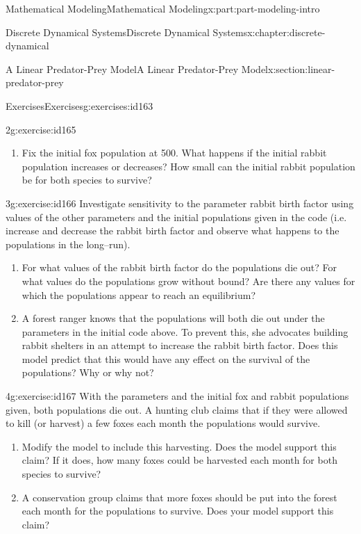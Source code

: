 \documentclass[oneside,10pt,]{book}
\numberwithin{equation}{section}
\begin{document}
\begin{partptx}{Mathematical Modeling}{}{Mathematical Modeling}{}{}{x:part:part-modeling-intro}
\begin{chapterptx}{Discrete Dynamical Systems}{}{Discrete Dynamical Systems}{}{}{x:chapter:discrete-dynamical}
\begin{sectionptx}{A Linear Predator-Prey Model}{}{A Linear Predator-Prey Model}{}{}{x:section:linear-predator-prey}
\begin{exercises-subsection-numberless}{Exercises}{}{Exercises}{}{}{g:exercises:id163}
\begin{divisionexercise}{2}{}{}{g:exercise:id165}
\begin{enumerate}[font=\bfseries,label=(\alph*),ref=\alph*]
\item{}Fix the initial fox population at 500. What happens if the initial rabbit population increases or decreases? How small can the initial rabbit population be for both species to survive?%
\end{enumerate}
\end{divisionexercise}%
\begin{divisionexercise}{3}{}{}{g:exercise:id166}%
Investigate sensitivity to the parameter rabbit birth factor using values of the other parameters and the initial populations given in the code (i.e. increase and decrease the rabbit birth factor and observe what happens to the populations in the long–run).%
\begin{enumerate}[font=\bfseries,label=(\alph*),ref=\alph*]
\item{}For what values of the rabbit birth factor do the populations die out? For what values do the populations grow without bound? Are there any values for which the populations appear to reach an equilibrium?%
\item{}A forest ranger knows that the populations will both die out under the parameters in the initial code above. To prevent this, she advocates building rabbit shelters in an attempt to increase the rabbit birth factor. Does this model predict that this would have any effect on the survival of the populations? Why or why not?%
\end{enumerate}
\end{divisionexercise}%
\begin{divisionexercise}{4}{}{}{g:exercise:id167}%
With the parameters and the initial fox and rabbit populations given, both populations die out. A hunting club claims that if they were allowed to kill (or harvest) a few foxes each month the populations would survive.%
\begin{enumerate}[font=\bfseries,label=(\alph*),ref=\alph*]
\item{}Modify the model to include this harvesting. Does the model support this claim? If it does, how many foxes could be harvested each month for both species to survive?%
\item{}A conservation group claims that more foxes should be put into the forest each month for the populations to survive. Does your model support this claim?%
\end{enumerate}
\end{divisionexercise}%
\end{exercises-subsection-numberless}
\end{sectionptx}

\end{chapterptx}
\end{partptx}
\end{document}
